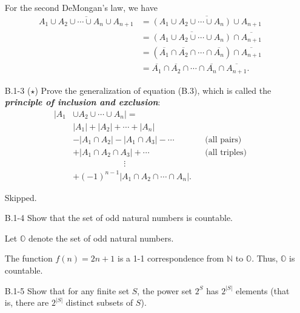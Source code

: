 \begin{enumerate}
\begin{framed}
For the second DeMongan's law, we have
\begin{equation*}
\begin{aligned}
  \overline{A_1 \cup A_2 \cup \cdots \cup A_n \cup A_{n + 1}}
  &= \overline{(A_1 \cup A_2 \cup \cdots \cup A_n) \cup A_{n + 1}}\\
  &= \overline{(A_1 \cup A_2 \cup \cdots \cup A_n)} \cap \overline{A_{n + 1}}\\
  &= (\overline{A_1} \cap \overline{A_2} \cap \cdots \cap \overline{A_n}) \cap \overline{A_{n + 1}}\\
  &= \overline{A_1} \cap \overline{A_2} \cap \cdots \cap \overline{A_n} \cap \overline{A_{n + 1}}.
\end{aligned}
\end{equation*}
\end{framed}

\item[B.1{-}3]{($\star$) Prove the generalization of equation (B.3), which is
called the \textbf{\emph{principle of inclusion and exclusion}}:
\begin{equation*}
\begin{aligned}
  | A_1 &\cup A_2 \cup \cdots \cup A_n | =\\
        &|A_1| + |A_2| + \cdots + |A_n|\\
        &- |A_1 \cap A_2| - |A_1 \cap A_3| - \cdots && \text{(all pairs)}\\
        &+ |A_1 \cap A_2 \cap A_3| + \cdots && \text{(all triples)}\\
        &\qquad\qquad\qquad\vdots\\
        &+ (-1)^{n - 1} |A_1 \cap A_2 \cap \cdots \cap A_n|.
\end{aligned}
\end{equation*}
}

\begin{framed}
Skipped.
\end{framed}

\item[B.1{-}4]{Show that the set of odd natural numbers is countable.}

\begin{framed}
Let $\mathbb{O}$ denote the set of odd natural numbers.

The function $f(n) = 2n + 1$ is a 1-1 correspondence from $\mathbb{N}$ to
$\mathbb{O}$.  Thus, $\mathbb{O}$ is countable.
\end{framed}

\newpage

\item[B.1{-}5]{Show that for any finite set $S$, the power set $2^S$ has
$2^{|S|}$ elements (that is, there are $2^{|S|}$ distinct subsets of $S$).}


\end{enumerate}
